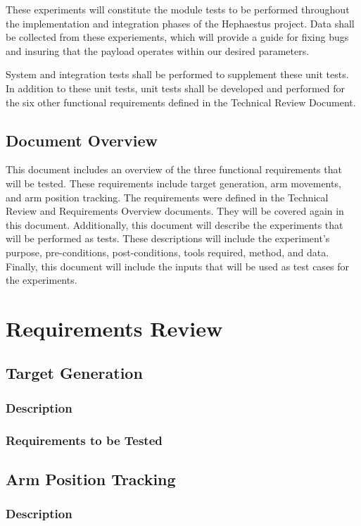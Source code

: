 \documentclass[letterpaper,10pt]{article}
\begin{document}
These experiments will constitute the module tests to be performed throughout 
the implementation and integration phases of the Hephaestus project. Data shall 
be collected from these experiements, which will provide a guide for fixing bugs 
and insuring that the payload operates within our desired parameters. 

System and integration tests shall be performed to supplement these unit tests. 
In addition to these unit tests, unit tests shall be developed and performed for 
the six other functional requirements defined in the Technical Review Document.

\subsection{Document Overview}
This document includes an overview of the three functional requirements that
will be tested. These requirements include target generation, arm movements, and 
arm position tracking. The requirements were defined in the Technical Review 
and Requirements Overview documents. They will be covered again in this
document. Additionally, this document will describe the experiments that will be 
performed as tests. These descriptions will include the experiment's purpose, 
pre-conditions, post-conditions, tools required, method, and data. Finally, this 
document will include the inputs that will be used as test cases for the 
experiments.

\section{Requirements Review}

\subsection{Target Generation}
\subsubsection{Description}
\subsubsection{Requirements to be Tested}

\subsection{Arm Position Tracking}
\subsubsection{Description}
\end{document}
